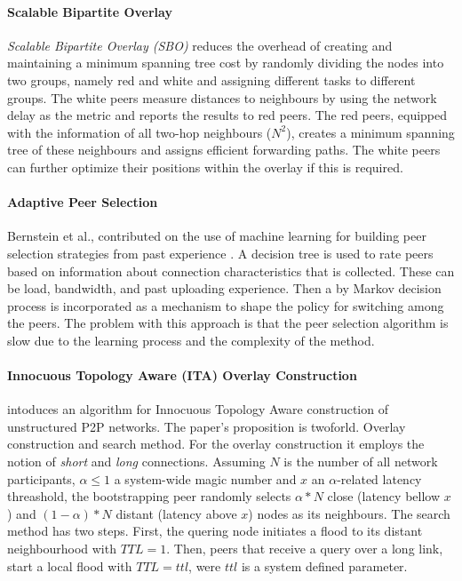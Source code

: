 \paragraph*{\bf Scalable Bipartite Overlay}
\emph{Scalable Bipartite Overlay
(SBO)} \cite{liu_bipartite_IPDPS,liu_bipartite_2007} reduces the overhead of
creating and maintaining a minimum spanning tree cost by randomly dividing the
nodes into two groups, namely red and white and assigning different tasks to
different groups. The white peers measure distances to neighbours by using the
network delay as the metric and reports the results to red peers. The red peers,
equipped with the information of all two-hop neighbours ($N^2$), creates a
minimum spanning tree of these neighbours and assigns efficient forwarding
paths. The white peers can further optimize their positions within the overlay
if this is required.

\paragraph*{\bf Adaptive Peer Selection}
Bernstein et al., contributed on the use of machine learning for building peer
selection strategies from past experience \cite{bflz_adaptpeersel_2003}. A
decision tree is used to rate peers based on information about connection
characteristics that is collected. These can be load, bandwidth, and past
uploading experience. Then a by Markov decision process is incorporated as a
mechanism to shape the policy for switching among the peers. The problem
with this approach is that the peer selection algorithm is slow due to the
learning process and the complexity of the method.

\paragraph*{\bf Innocuous Topology Aware (ITA) Overlay Construction}
\cite{prfm_ita_2009} intoduces an algorithm for Innocuous Topology Aware
construction of unstructured P2P networks. The paper's proposition is twoforld.
Overlay construction and search method. For the overlay construction it employs
the notion of \emph{short} and \emph{long} connections. Assuming $N$ is the
number of all network participants, $\alpha \leq 1 $ a system-wide magic number
and $x$ an $\alpha$-related latency threashold, the bootstrapping peer randomly
selects $\alpha \ast N$ close (latency bellow $x$) and
$\left( 1 - \alpha \right) \ast N$ distant (latency above $x$) nodes as its
neighbours. The search method has two steps. First, the quering node initiates a
flood to its distant neighbourhood with $TTL = 1$. Then, peers that receive a
query over a long link, start a local flood with $TTL = ttl$, were $ttl$ is a
system defined parameter.

